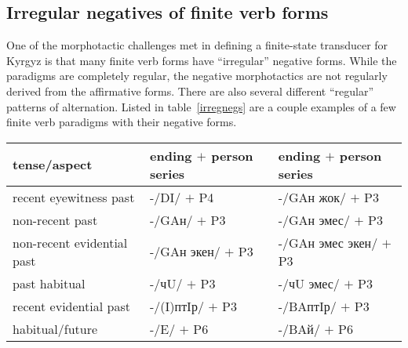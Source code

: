 \documentclass[10pt,a4paper,twocolumn]{article}
\begin{document}



\subsection{Irregular negatives of finite verb forms}

One of the morphotactic challenges met in defining a finite-state transducer for Kyrgyz is that many finite verb forms have ``irregular'' negative forms.  While the paradigms are completely regular, the negative morphotactics are not regularly derived from the affirmative forms.  There are also several different ``regular'' patterns of alternation.  Listed in table~\ref{irregnegs} are a couple examples of a few finite verb paradigms with their negative forms.

\begin{table*}[htbp]
	\caption{Examples of different affirmative / negative alternations in finite verb forms}\label{irregnegs}
	\centering
	\begin{tabular}{lll}
		\toprule
		tense/aspect & ending $+$ person series & ending $+$ person series \\
		\midrule
		recent eyewitness past & -/DI/ $+$ P4\footnotemark{} & -/GAн жок/ $+$ P3\\
		non-recent past & -/GAн/ $+$ P3 & -/GAн эмес/ $+$ P3\\
		non-recent evidential past & -/GAн экен/ $+$ P3 & -/GAн эмес экен/ $+$ P3\\
		past habitual & -/чU/ $+$ P3 & -/чU эмес/ $+$ P3\\
		recent evidential past & -/(I)птIр/ $+$ P3 & -/BAптIр/ $+$ P3\\
		habitual/future & -/E/ $+$ P6 & -/BAй/ $+$ P6\\
		\bottomrule
	\end{tabular}
\end{table*}

\end{document}
